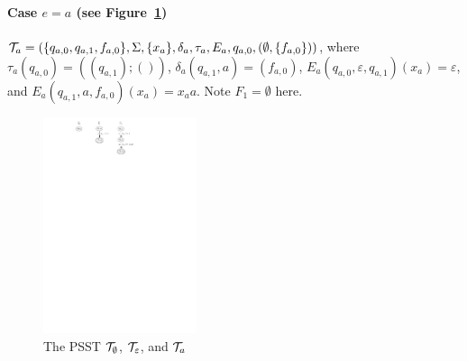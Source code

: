 \paragraph{Case $e = a$ (see Figure~\ref{fig-reg2pfa-0})} $\mathcal{T}_a = (\{q_{a,0}, q_{a,1}, f_{a,0}\}, \Sigma, \{x_a\}, \delta_a, \tau_a, E_a, q_{a,0}, (\emptyset, \{f_{a,0}\}))$, where 
$\tau_a(q_{a,0}) = ((q_{a,1}); ())$, 
%
$\delta_a(q_{a,1}, a) = (f_{a,0})$, 
%
%
$E_a(q_{a,0}, \varepsilon, q_{a,1})(x_a) = \varepsilon$, and $E_a(q_{a,1}, a, f_{a,0})(x_a) =x_aa$. Note $F_1 = \emptyset$ here. 
%		
\begin{figure}[ht]
	\centering
	\includegraphics[width = 0.4\textwidth]{reg2pfa-0.pdf}
	\caption{The PSST $\mathcal{T}_{\emptyset}$, $\mathcal{T}_{\varepsilon}$, and $\mathcal{T}_{a}$ }
	\label{fig-reg2pfa-0}
\end{figure}


